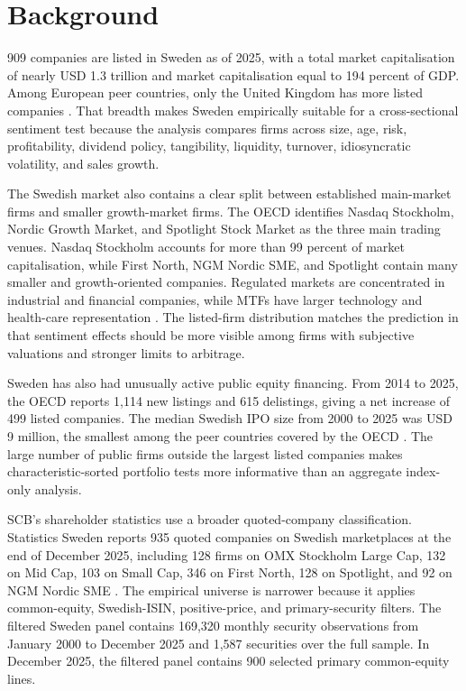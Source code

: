 \documentclass[11pt]{article}
\begin{document}
\section{Background}
909 companies are listed in Sweden as of 2025, with a total market capitalisation of nearly USD 1.3 trillion and market capitalisation equal to 194 percent of GDP. Among European peer countries, only the United Kingdom has more listed companies \citep{oecd2026swedishequitymarket}. That breadth makes Sweden empirically suitable for a cross-sectional sentiment test because the analysis compares firms across size, age, risk, profitability, dividend policy, tangibility, liquidity, turnover, idiosyncratic volatility, and sales growth.

The Swedish market also contains a clear split between established main-market firms and smaller growth-market firms. The OECD identifies Nasdaq Stockholm, Nordic Growth Market, and Spotlight Stock Market as the three main trading venues. Nasdaq Stockholm accounts for more than 99 percent of market capitalisation, while First North, NGM Nordic SME, and Spotlight contain many smaller and growth-oriented companies. Regulated markets are concentrated in industrial and financial companies, while MTFs have larger technology and health-care representation \citep{oecd2026swedishequitymarket}. The listed-firm distribution matches the prediction in \citet{baker2006sentiment} that sentiment effects should be more visible among firms with subjective valuations and stronger limits to arbitrage.

Sweden has also had unusually active public equity financing. From 2014 to 2025, the OECD reports 1,114 new listings and 615 delistings, giving a net increase of 499 listed companies. The median Swedish IPO size from 2000 to 2025 was USD 9 million, the smallest among the peer countries covered by the OECD \citep{oecd2026swedishequitymarket}. The large number of public firms outside the largest listed companies makes characteristic-sorted portfolio tests more informative than an aggregate index-only analysis.

SCB's shareholder statistics use a broader quoted-company classification. Statistics Sweden reports 935 quoted companies on Swedish marketplaces at the end of December 2025, including 128 firms on OMX Stockholm Large Cap, 132 on Mid Cap, 103 on Small Cap, 346 on First North, 128 on Spotlight, and 92 on NGM Nordic SME \citep{scb2026shareholders}. The empirical universe is narrower because it applies common-equity, Swedish-ISIN, positive-price, and primary-security filters. The filtered Sweden panel contains 169,320 monthly security observations from January 2000 to December 2025 and 1,587 securities over the full sample. In December 2025, the filtered panel contains 900 selected primary common-equity lines.
\end{document}
